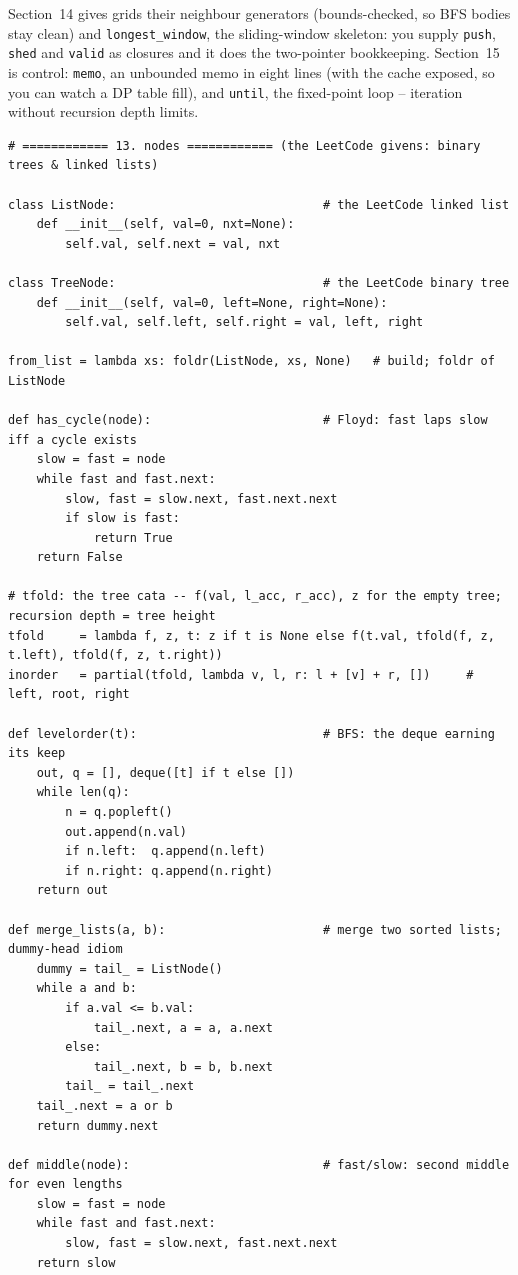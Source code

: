 \documentclass[11pt,letterpaper]{book}
\begin{document}
Section~14 gives grids their neighbour generators (bounds-checked, so BFS
bodies stay clean) and \texttt{longest\_window}, the sliding-window skeleton:
you supply \texttt{push}, \texttt{shed} and \texttt{valid} as closures and it
does the two-pointer bookkeeping. Section~15 is control: \texttt{memo},
an unbounded memo in eight lines (with the cache exposed, so you can watch a DP
table fill), and \texttt{until}, the fixed-point loop -- iteration without
recursion depth limits.
\begin{lstlisting}[style=code]
# ============ 13. nodes ============ (the LeetCode givens: binary trees & linked lists)

class ListNode:                             # the LeetCode linked list
    def __init__(self, val=0, nxt=None):
        self.val, self.next = val, nxt

class TreeNode:                             # the LeetCode binary tree
    def __init__(self, val=0, left=None, right=None):
        self.val, self.left, self.right = val, left, right

from_list = lambda xs: foldr(ListNode, xs, None)   # build; foldr of ListNode

def has_cycle(node):                        # Floyd: fast laps slow iff a cycle exists
    slow = fast = node
    while fast and fast.next:
        slow, fast = slow.next, fast.next.next
        if slow is fast:
            return True
    return False

# tfold: the tree cata -- f(val, l_acc, r_acc), z for the empty tree; recursion depth = tree height
tfold     = lambda f, z, t: z if t is None else f(t.val, tfold(f, z, t.left), tfold(f, z, t.right))
inorder   = partial(tfold, lambda v, l, r: l + [v] + r, [])     # left, root, right

def levelorder(t):                          # BFS: the deque earning its keep
    out, q = [], deque([t] if t else [])
    while len(q):
        n = q.popleft()
        out.append(n.val)
        if n.left:  q.append(n.left)
        if n.right: q.append(n.right)
    return out

def merge_lists(a, b):                      # merge two sorted lists; dummy-head idiom
    dummy = tail_ = ListNode()
    while a and b:
        if a.val <= b.val:
            tail_.next, a = a, a.next
        else:
            tail_.next, b = b, b.next
        tail_ = tail_.next
    tail_.next = a or b
    return dummy.next

def middle(node):                           # fast/slow: second middle for even lengths
    slow = fast = node
    while fast and fast.next:
        slow, fast = slow.next, fast.next.next
    return slow


\end{lstlisting}
\end{document}
